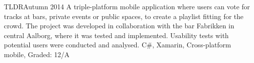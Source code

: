 \begin{projects}
	\project
	{TLDR}{Autumn 2014}
	{}
	{A triple-platform mobile application where users can vote for tracks at bars, private events or public spaces, to create a playlist fitting for the crowd. The project was developed in collaboration with the bar Fabrikken in central Aalborg, where it was tested and implemented. Usability tests with potential users were conducted and analysed.}
	{C\#, Xamarin, Cross-platform mobile, Graded: 12/A}

\end{projects}